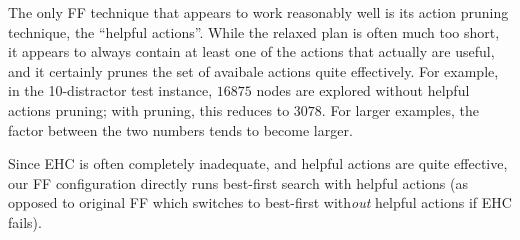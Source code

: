 The only FF technique that appears to work reasonably well is its
action pruning technique, the ``helpful actions''. While the relaxed
plan is often much too short, it appears to always contain at least
one of the actions that actually are useful, and it certainly prunes
the set of avaibale actions quite effectively. For example, in the
10-distractor test instance, $16875$ nodes are explored without
helpful actions pruning; with pruning, this reduces to $3078$. For
larger examples, the factor between the two numbers tends to become
larger. 



Since EHC is often completely inadequate, and helpful actions are
quite effective, our FF configuration directly runs best-first search
with helpful actions (as opposed to original FF which switches to
best-first with{\em out} helpful actions if EHC fails).










